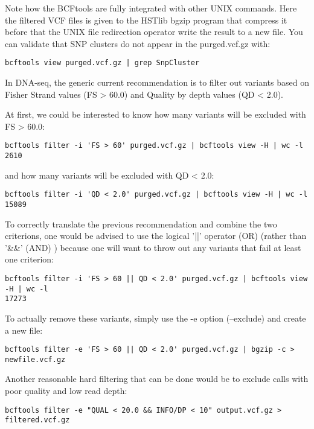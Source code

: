 Note how the BCFtools are fully integrated with other UNIX commands. Here the filtered VCF files is given to the HSTlib bgzip program that compress it before that the UNIX file redirection operator write the result to a new file. You can validate that SNP clusters do not appear in the purged.vcf.gz with:


\begin{verbatim}
bcftools view purged.vcf.gz | grep SnpCluster
\end{verbatim}

In DNA-seq, the generic current recommendation is to filter out variants based on Fisher Strand values (FS > 60.0) and Quality by depth values (QD < 2.0).

At first, we could be interested to know how many variants will be excluded with FS > 60.0:

\begin{verbatim}
bcftools filter -i 'FS > 60' purged.vcf.gz | bcftools view -H | wc -l
2610
\end{verbatim}

and how many variants will be excluded with QD < 2.0:

\begin{verbatim}
bcftools filter -i 'QD < 2.0' purged.vcf.gz | bcftools view -H | wc -l
15089
\end{verbatim}


To correctly translate the previous recommendation and combine the two criterions, one would be advised to use the logical '||' operator (OR) (rather than '\&\&' (AND) ) because one will want to throw out any variants that fail at least one criterion:

\begin{verbatim}
bcftools filter -i 'FS > 60 || QD < 2.0' purged.vcf.gz | bcftools view -H | wc -l
17273
\end{verbatim}


To actually remove these variants, simply use the -e option (--exclude) and create a new file:

\begin{verbatim}
bcftools filter -e 'FS > 60 || QD < 2.0' purged.vcf.gz | bgzip -c > newfile.vcf.gz
\end{verbatim}


Another reasonable hard filtering that can be done would be to exclude calls with poor quality and low read depth:

\begin{verbatim}
bcftools filter -e "QUAL < 20.0 && INFO/DP < 10" output.vcf.gz > filtered.vcf.gz
\end{verbatim}

